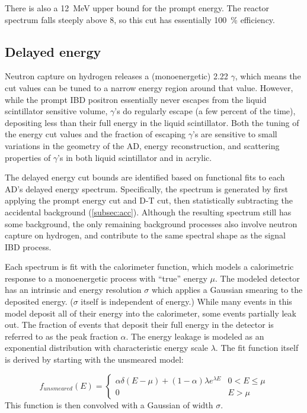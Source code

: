 There is also a \SI{12}{\mega\electronvolt} upper bound for the prompt energy.
The reactor \nuebar{} spectrum falls steeply above \SI{8}{\mev},
so this cut has essentially \SI{100}{\percent} efficiency.

\subsection{Delayed energy}
\label{subsec:delayed}

Neutron capture on hydrogen releases a (monoenergetic)
\SI{2.22}{\mev} $\gamma$,
which means the cut values can be tuned to a narrow energy region
around that value.
However, while the prompt IBD positron essentially never escapes
from the liquid scintillator sensitive volume,
$\gamma$'s do regularly escape (a few percent of the time),
depositing less than their full energy in the liquid scintillator.
Both the tuning of the energy cut values
and the fraction of escaping $\gamma$'s are sensitive to
small variations in the geometry of the AD, energy reconstruction,
and scattering properties of $\gamma$'s in
both liquid scintillator and in acrylic.

The delayed energy cut bounds are identified based on
functional fits to each AD's delayed energy spectrum.
Specifically, the spectrum is generated by first applying
the prompt energy cut and D-T cut,
then statistically subtracting the accidental background (\cref{subsec:acc}).
Although the resulting spectrum still has some background,
the only remaining background processes also involve
neutron capture on hydrogen, and contribute to the same spectral shape
as the signal IBD process.

Each spectrum is fit with the calorimeter function, which models
a calorimetric response to a monoenergetic process with ``true''
energy $\mu$.
The modeled detector has an intrinsic and energy resolution $\sigma$
which applies a Gaussian smearing to the deposited energy.
($\sigma$ itself is independent of energy.)
While many events in this model deposit all of their energy into
the calorimeter, some events partially leak out.
The fraction of events that deposit their full energy in the detector
is referred to as the peak fraction $\alpha$.
The energy leakage is modeled as an exponential distribution
with characteristic energy scale $\lambda$.
The fit function itself is derived by starting with
the unsmeared model:

\begin{equation*}
    f_{unsmeared}(E) =
    \begin{cases}
        \alpha\delta(E-\mu) + (1-\alpha)\lambda e^{\lambda E}
        & 0 < E \leq \mu \\
        0 & E > \mu
    \end{cases}
\end{equation*}
This function is then convolved with a Gaussian
of width $\sigma$.

